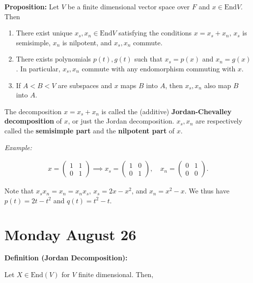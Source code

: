 \textbf{Proposition:} Let \(V\) be a finite dimensional vector space
over \(F\) and \(x\in\mathrm{End} V\). Then

\begin{enumerate}
\def\labelenumi{\alph{enumi}.}
\item
  There exist unique \(x_s, x_n \in \mathrm{End} V\) satisfying the
  conditions \(x = x_s + x_n\), \(x_s\) is semisimple, \(x_n\) is
  nilpotent, and \(x_s, x_n\) commute.
\item
  There exists polynomials \(p(t), g(t)\) such that \(x_s = p(x)\) and
  \(x_n = g(x)\). In particular, \(x_s, x_n\) commute with any
  endomorphism commuting with \(x\).
\item
  If \(A < B < V\) are subspaces and \(x\) maps \(B\) into \(A\), then
  \(x_s, x_n\) also map \(B\) into \(A\).
\end{enumerate}

The decomposition \(x = x_s + x_n\) is called the (additive)
\textbf{Jordan-Chevalley decomposition} of \(x\), or just the Jordan
decomposition. \(x_s, x_n\) are respectively called the
\textbf{semisimple part} and the \textbf{nilpotent part} of \(x\).

\emph{Example:}

\begin{align*}
x = \left(\begin{array}{ll}{1} & {1} \\ {0} & {1}\end{array}\right) \implies
x_s = \left(\begin{array}{ll}{1} & {0} \\ {0} & {1}\end{array}\right),\quad
x_n = \left(\begin{array}{ll}{0} & {1} \\ {0} & {0}\end{array}\right)
.\end{align*}

Note that \(x_s x_n = x_n = x_n x_s\), \(x_s = 2x - x^2\), and
\(x_n = x^2 - x\). We thus have \(p(t) = 2t-t^2\) and
\(q(t) = t^2 - t\).

\hypertarget{monday-august-26}{%
\section{Monday August 26}\label{monday-august-26}}

\textbf{Definition (Jordan Decomposition):}

Let \(X \in \mathrm{End}(V)\) for \(V\) finite dimensional. Then,

